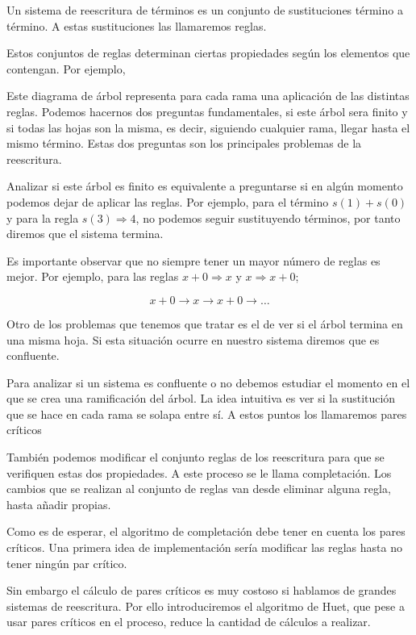 Un sistema de reescritura de términos es un conjunto de sustituciones
término a término. A estas sustituciones las llamaremos reglas.

Estos conjuntos de reglas determinan ciertas propiedades según los
elementos que contengan. Por ejemplo,

\begin{figure}[h]
  \centering
\end{figure}

Este diagrama de árbol representa para cada rama una aplicación de las
distintas reglas. Podemos hacernos dos preguntas fundamentales, si
este árbol sera finito y si todas las hojas son la misma, es decir,
siguiendo cualquier rama, llegar hasta el mismo término. Estas dos
preguntas son los principales problemas de la reescritura.

Analizar si este árbol es finito es equivalente a preguntarse si en
algún momento podemos dejar de aplicar las reglas. Por ejemplo, para
el término $s(1) + s(0)$ y para la regla $s(3) \Rightarrow 4$, no
podemos seguir sustituyendo términos, por tanto diremos que el sistema
termina.

Es importante observar que no siempre tener un mayor número de reglas
es mejor. Por ejemplo, para las reglas $ x + 0 \Rightarrow x$ y
$x \Rightarrow x + 0$;

\[
  x + 0 \longrightarrow x \longrightarrow x+0 \longrightarrow \dots
\]

Otro de los problemas que tenemos que tratar es el de ver si el árbol
termina en una misma hoja. Si esta situación ocurre en nuestro sistema
diremos que es confluente.

Para analizar si un sistema es confluente o no debemos estudiar el
momento en el que se crea una ramificación del árbol. La idea
intuitiva es ver si la sustitución que se hace en cada rama se solapa
entre sí. A estos puntos los llamaremos pares críticos

También podemos modificar el conjunto reglas de los reescritura para
que se verifiquen estas dos propiedades. A este proceso se le llama
completación. Los cambios que se realizan al conjunto de reglas van
desde eliminar alguna regla, hasta añadir propias.

Como es de esperar, el algoritmo de completación debe tener en cuenta
los pares críticos. Una primera idea de implementación sería modificar
las reglas hasta no tener ningún par crítico.

Sin embargo el cálculo de pares críticos es muy costoso si hablamos de
grandes sistemas de reescritura. Por ello introduciremos el algoritmo
de Huet, que pese a usar pares críticos en el proceso, reduce la
cantidad de cálculos a realizar.


